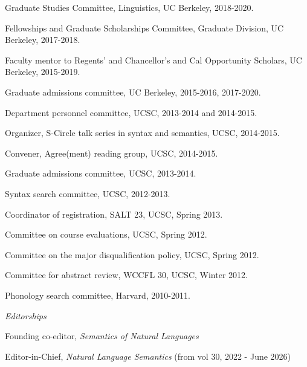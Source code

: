\documentclass[12pt]{article}
\begin{document}
\ind Graduate Studies Committee, Linguistics, UC Berkeley, 2018-2020.


\ind Fellowships and Graduate Scholarships Committee, Graduate Division, UC Berkeley, 2017-2018.


\ind Faculty mentor to Regents' and Chancellor's and Cal Opportunity Scholars, UC Berkeley, 2015-2019.

\ind Graduate admissions committee, UC Berkeley, 2015-2016, 2017-2020.


 

\ind 	Department personnel committee, UCSC, 2013-2014 and 2014-2015.


\ind 	Organizer, S-Circle talk series in syntax and semantics, UCSC, 2014-2015.

\ind Convener, Agree(ment) reading group, %
UCSC, 2014-2015.


\ind 	Graduate admissions committee, UCSC, 2013-2014.


\ind 	Syntax search committee, UCSC, 2012-2013.

\ind	Coordinator of registration, SALT 23, UCSC, Spring 2013.

\ind 	Committee on course evaluations, UCSC, Spring 2012.

\ind	Committee on the major disqualification policy, UCSC, Spring 2012.

\ind	Committee for abstract review, WCCFL 30, UCSC, Winter 2012. 



\ind Phonology search committee, Harvard, 2010-2011.



\bigskip









\noindent\emph{Editorships\vspace{0.05in}}

\ind Founding co-editor, \emph{Semantics of Natural Languages}

\ind Editor-in-Chief, \emph{Natural Language Semantics} (from vol 30, 2022 - June 2026)
\end{document}
